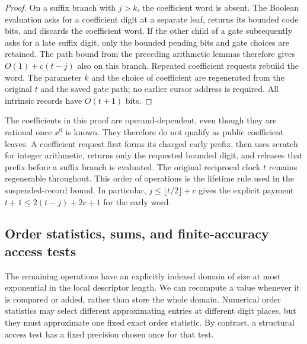 \documentclass[11pt]{article}
\numberwithin{equation}{section}
\theoremstyle{definition}
\theoremstyle{remark}
\begin{document}
\begin{proof}
On a suffix branch with $j>k$, the coefficient word is absent.
The Boolean evaluation asks for a coefficient digit at a separate
leaf, returns its bounded code bits, and discards the coefficient
word.  If the other child of a gate subsequently asks for a late
suffix digit, only the bounded pending bits and gate choices are
retained.  The path bound from the preceding arithmetic lemmas
therefore gives $O(1)+c(t-j)$ also on this branch.  Repeated
coefficient requests rebuild the word.  The parameter $k$ and the
choice of coefficient are regenerated from the original $t$ and
the saved gate path; no earlier cursor address is required.
All intrinsic records have $O(t+1)$ bits.
\end{proof}

The coefficients in this proof are operand-dependent, even though they
are rational once $x^0$ is known.  They therefore do not qualify as
public coefficient leaves.  A coefficient request first forms its
charged early prefix, then uses scratch for integer arithmetic, returns
only the requested bounded digit, and releases that prefix before a
suffix branch is evaluated.  The original reciprocal clock $t$ remains
regenerable throughout.  This order of operations is the lifetime rule
used in the suspended-record bound.  In particular, $j\le\lfloor t/2\rfloor+c$
gives the explicit payment $t+1\le2(t-j)+2c+1$ for the early word.

\subsection{Order statistics, sums, and finite-accuracy access tests}

The remaining operations have an explicitly indexed domain of size at most exponential in the local descriptor length. We can recompute a value whenever it is compared or added, rather than store the whole domain. Numerical order statistics may select different approximating entries at different digit places, but they must approximate one fixed exact order statistic. By contrast, a structural access test has a fixed precision chosen once for that test.
\end{document}
